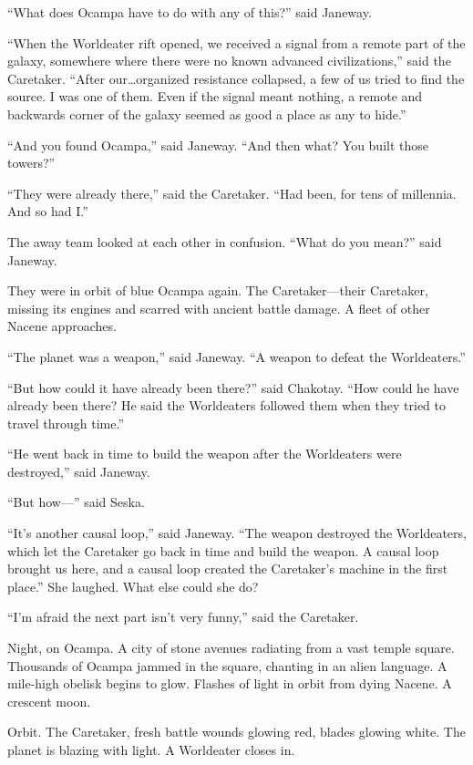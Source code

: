 \documentclass[twoside,letterpaper,12pt]{memoir}
\begin{document}
``What does Ocampa have to do with any of this?'' said Janeway. 

``When the Worldeater rift opened, we received a signal from a remote part of the galaxy, somewhere where there were no known advanced civilizations,'' said the Caretaker. ``After our\ldots organized resistance collapsed, a few of us tried to find the source. I was one of them. Even if the signal meant nothing, a remote and backwards corner of the galaxy seemed as good a place as any to hide.'' 

``And you found Ocampa,'' said Janeway. ``And then what? You built those towers?'' 

``They were already there,'' said the Caretaker. ``Had been, for tens of millennia. And so had I.'' 

The away team looked at each other in confusion. ``What do you mean?'' said Janeway. 

They were in orbit of blue Ocampa again. The Caretaker—their Caretaker, missing its engines and scarred with ancient battle damage. A fleet of other Nacene approaches. 

``The planet was a weapon,'' said Janeway. ``A weapon to defeat the Worldeaters.'' 

``But how could it have already been there?'' said Chakotay. ``How could he have already been there? He said the Worldeaters followed them when they tried to travel through time.'' 

``He went back in time to build the weapon after the Worldeaters were destroyed,'' said Janeway. 

``But how—'' said Seska. 

``It’s another causal loop,'' said Janeway. ``The weapon destroyed the Worldeaters, which let the Caretaker go back in time and build the weapon. A causal loop brought us here, and a causal loop created the Caretaker’s machine in the first place.'' She laughed. What else could she do? 

``I’m afraid the next part isn’t very funny,'' said the Caretaker. 

Night, on Ocampa. A city of stone avenues radiating from a vast temple square. Thousands of Ocampa jammed in the square, chanting in an alien language. A mile-high obelisk begins to glow. Flashes of light in orbit from dying Nacene. A crescent moon. 

Orbit. The Caretaker, fresh battle wounds glowing red, blades glowing white. The planet is blazing with light. A Worldeater closes in. 
\end{document}
